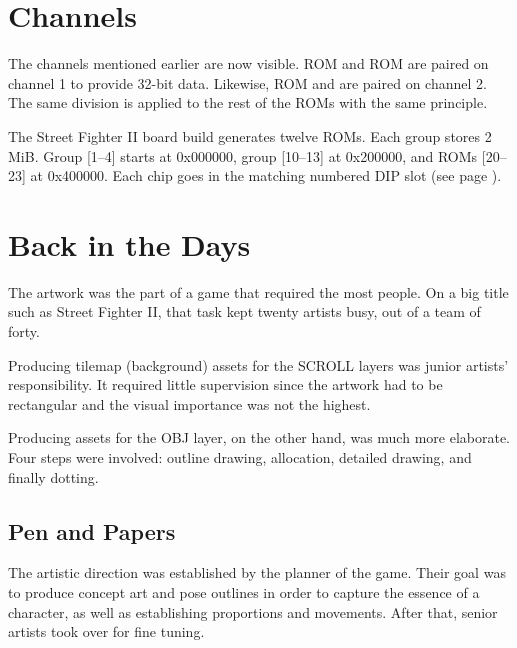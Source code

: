 
\section{Channels}\label{channels}
The channels mentioned earlier are now visible. ROM  and ROM  are paired on channel 1 to provide 32-bit data. Likewise, ROM  and  are paired on channel 2. The same division is applied to the rest of the ROMs with the same principle. 


The Street Fighter II board build generates twelve ROMs. Each group stores 2 MiB. Group [1--4] starts at 0x000000, group [10--13] at 0x200000, and ROMs [20--23] at 0x400000. Each chip goes in the matching numbered DIP slot (see page \pageref{boardb_no_chips}).










\section{Back in the Days}

The artwork was the part of a game that required the most people. On a big title such as Street Fighter II, that task kept twenty artists busy, out of a team of forty.

Producing tilemap (background) assets for the SCROLL layers was junior artists' responsibility. It required little supervision since the artwork had to be rectangular and the visual importance was not the highest.

Producing assets for the OBJ layer, on the other hand, was much more elaborate. Four steps were involved: outline drawing, allocation, detailed drawing, and finally dotting.



\subsection{Pen and Papers}
The artistic direction was established by the planner of the game. Their goal was to produce concept art and pose outlines in order to capture the essence of a character, as well as establishing proportions and movements. After that, senior artists took over for fine tuning.

